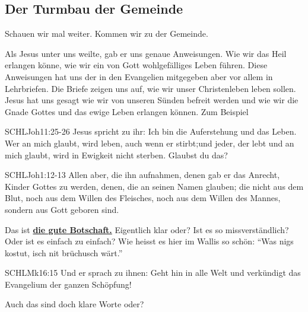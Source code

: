 \documentclass[14pt]{../../inc/mybib}
\newenvironment{block}[1][]{%
  \vspace{1.5em}%
  \noindent\textbf{#1}\par%
  \vspace{0.0em}%
}{%
  \vspace{1em}%
}
\begin{document}
    \subsection{Der Turmbau der Gemeinde}
    Schauen wir mal weiter. Kommen wir zu der Gemeinde.
    \begin{block}
    Als Jesus unter uns weilte, gab er uns genaue Anweisungen. Wie wir das Heil erlangen könne, wie wir ein von Gott wohlgefälliges Leben führen. Diese Anweisungen hat uns der \herr{} in den Evangelien mitgegeben aber vor allem in Lehrbriefen. Die Briefe zeigen uns auf, wie wir unser Christenleben leben sollen.
    Jesus hat uns gesagt wie wir von unseren Sünden befreit werden und wie wir die Gnade Gottes und das ewige Leben erlangen können. Zum Beispiel
    \begin{bibelbox}{SCHL}{Joh}{11:25-26}
        Jesus spricht zu ihr: Ich bin die Auferstehung und das Leben. Wer an mich glaubt, wird leben, auch wenn er stirbt;und jeder, der lebt und an mich glaubt, wird in Ewigkeit nicht sterben. Glaubst du das?
    \end{bibelbox} 
    \begin{bibelbox}{SCHL}{Joh}{1:12-13}
        Allen aber, die ihn aufnahmen, denen gab er das Anrecht, Kinder Gottes zu werden, denen, die an seinen Namen glauben;
        die nicht aus dem Blut, noch aus dem Willen des Fleisches, noch aus dem Willen des Mannes, sondern aus Gott geboren sind.
    \end{bibelbox} 
    Das ist \textbf{\underline{die gute Botschaft.}}
    Eigentlich klar oder? Ist es so missverständlich? Oder ist es einfach zu einfach? Wie heisst es hier im Wallis so schön: \enquote{Was nigs kostut, isch nit brüchusch wärt.}
    \begin{bibelbox}{SCHL}{Mk}{16:15}
        Und er sprach zu ihnen: Geht hin in alle Welt und verkündigt das Evangelium der ganzen Schöpfung!
    \end{bibelbox} 
    Auch das sind doch klare Worte oder?
\end{block}
\end{document}
